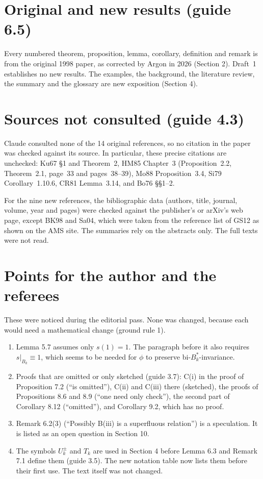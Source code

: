 \documentclass[12pt,letterpaper]{amsart}
\begin{document}
\section{Original and new results (guide 6.5)}

Every numbered theorem, proposition, lemma, corollary, definition and remark
is from the original 1998 paper, as corrected by Argon in 2026 (Section 2).
Draft~1 establishes no new results. The examples, the background, the
literature review, the summary and the glossary are new exposition (Section
4).

\section{Sources not consulted (guide 4.3)}

Claude consulted none of the 14 original references, so no citation in the
paper was checked against its source. In particular, these precise citations
are unchecked: Ku67 \S1 and Theorem~2, HM85 Chapter~3 (Proposition~2.2,
Theorem~2.1, page~33 and pages~38--39), Mo88 Proposition~3.4, Si79
Corollary~1.10.6, CR81 Lemma~3.14, and Bo76 \S\S1--2.

For the nine new references, the bibliographic data (authors, title,
journal, volume, year and pages) were checked against the publisher's or
arXiv's web page, except BK98 and Sa04, which were taken from the reference
list of GS12 as shown on the AMS site. The summaries rely on the abstracts
only. The full texts were not read.

\section{Points for the author and the referees}

These were noticed during the editorial pass. None was changed, because each
would need a mathematical change (ground rule 1).
\begin{enumerate}
\item Lemma 5.7 assumes only $s(1)=1$. The paragraph before it also requires
$s|_{B_k}\equiv1$, which seems to be needed for $\phi$ to preserve
bi-$B_k^*$-invariance.
\item Proofs that are omitted or only sketched (guide 3.7): C(i) in the proof
of Proposition 7.2 (``is omitted''), C(ii) and C(iii) there (sketched), the
proofs of Propositions 8.6 and 8.9 (``one need only check''), the second part
of Corollary 8.12 (``omitted''), and Corollary 9.2, which has no proof.
\item Remark 6.2(3) (``Possibly B(iii) is a superfluous relation'') is a
speculation. It is listed as an open question in Section 10.
\item The symbols $U_k^\pm$ and $T_k$ are used in Section 4 before Lemma 6.3
and Remark 7.1 define them (guide 3.5). The new notation table now lists
them before their first use. The text itself was not changed.
\end{enumerate}
\end{document}
